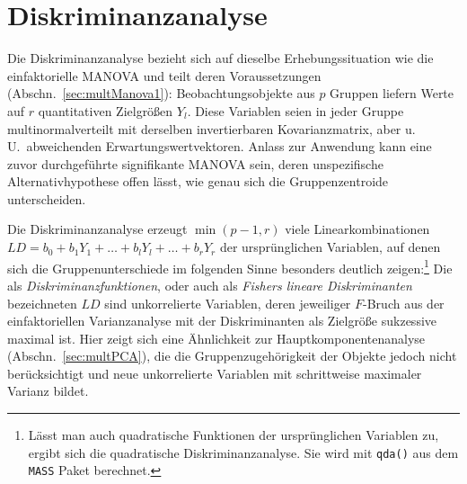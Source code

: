 \section{Diskriminanzanalyse}
\label{sec:multDA}

Die Diskriminanzanalyse bezieht sich auf dieselbe Erhebungssituation wie die einfaktorielle MANOVA und teilt deren Voraussetzungen (Abschn.\ \ref{sec:multManova1}): Beobachtungsobjekte aus $p$ Gruppen liefern Werte auf $r$ quantitativen Zielgrößen $Y_{l}$. Diese Variablen seien in jeder Gruppe multinormalverteilt mit derselben invertierbaren Kovarianzmatrix, aber u.\,U.\ abweichenden Erwartungswertvektoren. Anlass zur Anwendung kann eine zuvor durchgeführte signifikante MANOVA sein, deren unspezifische Alternativhypothese offen lässt, wie genau sich die Gruppenzentroide unterscheiden.

Die Diskriminanzanalyse erzeugt $\min({p-1, r})$ viele Linearkombinationen $LD = b_{0} + b_{1} Y_{1} + {\dots} + b_{l} Y_{l} + {\dots} + b_{r} Y_{r}$ der ursprünglichen Variablen, auf denen sich die Gruppenunterschiede im folgenden Sinne besonders deutlich zeigen:\footnote{Lässt man auch quadratische Funktionen der ursprünglichen Variablen zu, ergibt sich die quadratische Diskriminanzanalyse. Sie wird mit \lstinline!qda()! aus dem \lstinline!MASS! Paket berechnet.} Die als \emph{Diskriminanzfunktionen}, oder auch als \emph{Fishers lineare Diskriminanten} bezeichneten $LD$ sind unkorrelierte Variablen, deren jeweiliger $F$-Bruch aus der einfaktoriellen Varianzanalyse mit der Diskriminanten als Zielgröße sukzessive maximal ist. Hier zeigt sich eine Ähnlichkeit zur Hauptkomponentenanalyse (Abschn.\ \ref{sec:multPCA}), die die Gruppenzugehörigkeit der Objekte jedoch nicht berücksichtigt und neue unkorrelierte Variablen mit schrittweise maximaler Varianz bildet.

